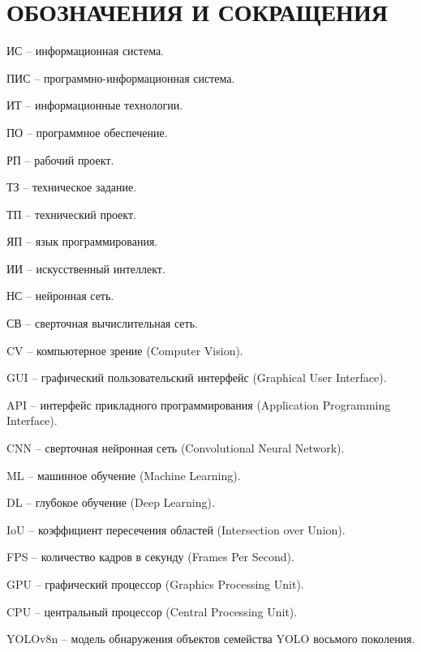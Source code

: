 \section*{ОБОЗНАЧЕНИЯ И СОКРАЩЕНИЯ}

ИС -- информационная система.

ПИС -- программно-информационная система.

ИТ -- информационные технологии. 

ПО -- программное обеспечение.

РП -- рабочий проект.

ТЗ -- техническое задание.

ТП -- технический проект.

ЯП -- язык программирования.

ИИ -- искусственный интеллект.

НС -- нейронная сеть.

СВ -- сверточная вычислительная сеть.

CV -- компьютерное зрение (Computer Vision).

GUI -- графический пользовательский интерфейс (Graphical User Interface).

API -- интерфейс прикладного программирования (Application Programming Interface).

CNN -- сверточная нейронная сеть (Convolutional Neural Network).

ML -- машинное обучение (Machine Learning).

DL -- глубокое обучение (Deep Learning).

IoU -- коэффициент пересечения областей (Intersection over Union).

FPS -- количество кадров в секунду (Frames Per Second).

GPU -- графический процессор (Graphics Processing Unit).

CPU -- центральный процессор (Central Processing Unit).

YOLOv8n -- модель обнаружения объектов семейства YOLO восьмого поколения.